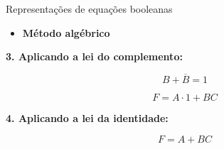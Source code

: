 
\begin{frame}{Representações de equações booleanas}

    \begin{itemize}
        \item \textbf{Método algébrico}
    \end{itemize}

    \vspace{0.3cm}

    \textbf{3. Aplicando a lei do complemento:}

    \[
        B + \overline{B} = 1
    \]

    \[
        F = A \cdot 1 + BC
    \]

    \textbf{4. Aplicando a lei da identidade:}

    \[
        \boxed{F = A + BC}
    \]

\end{frame}